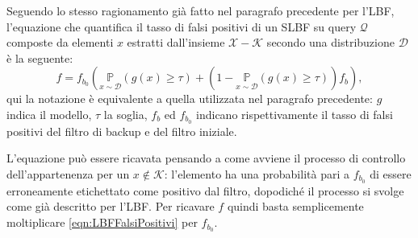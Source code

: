 \documentclass[../../main.tex]{subfiles}
\begin{document}
    Seguendo lo stesso ragionamento già fatto nel paragrafo precedente per l'LBF, l'equazione che quantifica il tasso di falsi positivi di un SLBF su query $\mathcal{Q}$ composte da elementi $x$ estratti dall'insieme $\mathcal{X} - \mathcal{K}$ secondo una distribuzione $\mathcal{D}$ è la seguente: 
    \begin{equation}
        f = f_{b_0}\left(\underset{x \sim \mathcal{D}}{\mathbb{P}}(g(x) \geq \tau) + (1 - \underset{x \sim \mathcal{D}}{\mathbb{P}}(g(x) \geq \tau))f_b\right),
        \label{eqn:SLBFFalsiPositivi}
    \end{equation}
    qui la notazione è equivalente a quella utilizzata nel paragrafo precedente: $g$ indica il modello, $\tau$ la soglia, $f_b$ ed $f_{b_0}$ indicano rispettivamente il tasso di falsi positivi del filtro di backup e del filtro iniziale.

    L'equazione può essere ricavata pensando a come avviene il processo di controllo dell'appartenenza per un $x \notin \mathcal{K}$: l'elemento ha una probabilità pari a $f_{b_0}$ di essere erroneamente etichettato come positivo dal filtro, dopodiché il processo si svolge come già descritto per l'LBF. Per ricavare $f$ quindi basta semplicemente moltiplicare \eqref{eqn:LBFFalsiPositivi} per $f_{b_0}$.
\end{document}
